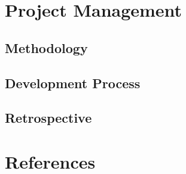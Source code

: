 \documentclass[12pt, a4paper]{scrreprt}
\begin{document}
	\part{Project Management}
	\chapter{Methodology}
	\chapter{Development Process}
	\chapter{Retrospective}
	\part{References}
\end{document}
